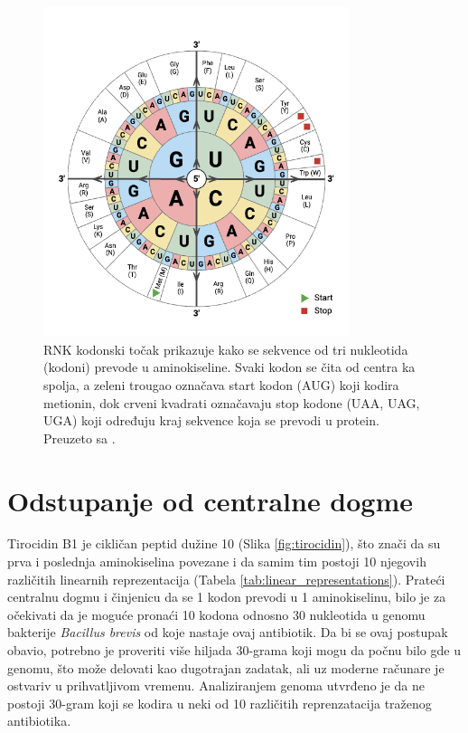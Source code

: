 \documentclass[12pt,oneside]{memoir}
\begin{document}
\begin{figure}[H]
  \centering
  \includegraphics[width=0.8\textwidth]{images/RNA-Codon-Wheel.png}
  \caption{RNK kodonski točak prikazuje kako se sekvence od tri nukleotida (kodoni) prevode u aminokiseline. Svaki kodon se čita od centra ka spolja, a zeleni trougao označava start kodon (AUG) koji kodira metionin, dok crveni kvadrati označavaju stop kodone (UAA, UAG, UGA) koji određuju kraj sekvence koja se prevodi u protein. Preuzeto sa \cite{codon_chart}.}
  \label{fig:codon-wheel}
\end{figure}


\section{Odstupanje od centralne dogme}
Tirocidin B1 je cikličan peptid dužine 10 (Slika \ref{fig:tirocidin}), što znači da su prva i poslednja aminokiselina povezane i da samim tim postoji 10 njegovih različitih linearnih reprezentacija (Tabela \ref{tab:linear_representations}). Prateći centralnu dogmu i činjenicu da se 1 kodon prevodi u 1 aminokiselinu, bilo je za očekivati da je moguće pronaći 10 kodona odnosno 30 nukleotida u genomu bakterije \emph{Bacillus brevis} od koje nastaje ovaj antibiotik. Da bi se ovaj postupak obavio, potrebno je proveriti više hiljada 30-grama koji mogu da počnu bilo gde u genomu, što može delovati kao dugotrajan zadatak, ali uz moderne računare je ostvariv u prihvatljivom vremenu. Analiziranjem genoma utvrđeno je da ne postoji 30-gram koji se kodira u neki od 10 različitih reprenzatacija traženog antibiotika.
\end{document}
